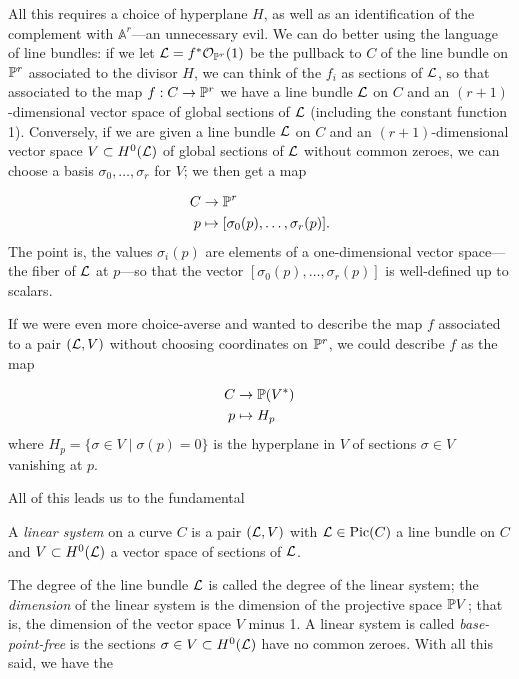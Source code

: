 \documentclass[12pt, leqno]{book}
\def\AA{{\mathbb A}}
\def\cL{{\cal L}}
\begin{document}
All this requires a choice of hyperplane $H$, as well as an identification of the complement with $\AA^r$---an unnecessary evil. We can do better using the language of line bundles: if we let $\cL = f^*\cO_{\PP^r}(1)$ be the pullback to $C$ of the line bundle on ${\mathbb P}^r$ associated to the divisor $H$, we can think of the $f_i$ as sections of $\cL$, so that associated to the map $f : C \to {\mathbb P}^r$ we have a line bundle $\cL$ on $C$ and an $(r+1)$-dimensional vector space of global sections of $\cL$ (including the constant function 1). Conversely, if we are given a line bundle $\cL$ on $C$ and an $(r+1)$-dimensional vector space $V \subset H^0(\cL)$ of global sections of $\cL$ without common zeroes, we can choose a basis $\sigma_0,\dots,\sigma_r$ for $V$; we then get a map 

\begin{align*}
C &\to {\mathbb P}^r \\
p &\mapsto [\sigma_0(p),\dots,\sigma_r(p)].
\end{align*}
The point is,  the values $\sigma_i(p)$ are elements of a one-dimensional vector space---the fiber of $\cL$ at $p$---so that the vector $[\sigma_0(p),\dots,\sigma_r(p)]$ is well-defined up to scalars.

If we were even more choice-averse and wanted to describe the map $f$ associated to a pair $(\cL, V)$ without choosing coordinates on ${\mathbb P}^r$, we could describe $f$ as the map

\begin{align*}
C &\to {\mathbb P}(V^*) \\
p &\mapsto H_p
\end{align*}
where $H_p = \{\sigma \in V \mid \sigma(p) = 0\}$ is the hyperplane in $V$ of sections $\sigma \in V$ vanishing at $p$.

All of this leads us to the fundamental

\begin{definition}
A \emph{linear system} on a curve $C$ is a pair $(\cL, V)$ with $\cL \in \Pic(C)$ a line bundle on $C$ and $V \subset H^0(\cL)$ a vector space of sections of $\cL$.
\end{definition}

The degree of the line bundle $\cL$ is called the degree of the linear system; the \emph{dimension} of the linear system is the dimension of the projective space ${\mathbb P} V$; that is, the dimension of the vector space $V$ minus 1. A linear system is called \emph{base-point-free} is the sections $\sigma \in V \subset H^0(\cL)$ have no common zeroes. With all this said, we have the 
\end{document}
